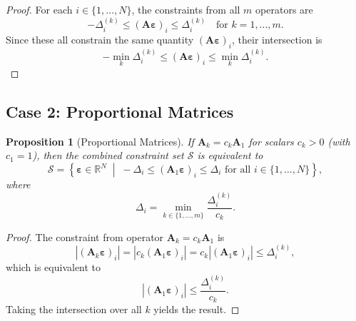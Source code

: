 \documentclass{article}
\newtheorem{proposition}{Proposition}
\begin{document}
\begin{proof}
For each $i \in \{1, \ldots, N\}$, the constraints from all $m$ operators are
\begin{equation}
    -\Delta_i^{(k)} \leq (\mathbf{A} \boldsymbol{\varepsilon})_i \leq \Delta_i^{(k)} \quad \text{for } k = 1, \ldots, m.
\end{equation}
Since these all constrain the same quantity $(\mathbf{A} \boldsymbol{\varepsilon})_i$, their intersection is
\begin{equation}
    -\min_k \Delta_i^{(k)} \leq (\mathbf{A} \boldsymbol{\varepsilon})_i \leq \min_k \Delta_i^{(k)}.
\end{equation}
\end{proof}

\subsection{Case 2: Proportional Matrices}

\begin{proposition}[Proportional Matrices]
\label{prop:proportional}
If $\mathbf{A}_k = c_k \mathbf{A}_1$ for scalars $c_k > 0$ (with $c_1 = 1$), then the combined constraint set $\mathcal{S}$ is equivalent to
\begin{equation}
    \mathcal{S} = \left\{ \boldsymbol{\varepsilon} \in \mathbb{R}^N \;\middle|\; -\Delta_i \leq (\mathbf{A}_1 \boldsymbol{\varepsilon})_i \leq \Delta_i \text{ for all } i \in \{1, \ldots, N\} \right\},
\end{equation}
where
\begin{equation}
    \Delta_i = \min_{k \in \{1, \ldots, m\}} \frac{\Delta_i^{(k)}}{c_k}.
\end{equation}
\end{proposition}

\begin{proof}
The constraint from operator $\mathbf{A}_k = c_k \mathbf{A}_1$ is
\begin{equation}
    |(\mathbf{A}_k \boldsymbol{\varepsilon})_i| = |c_k (\mathbf{A}_1 \boldsymbol{\varepsilon})_i| = c_k |(\mathbf{A}_1 \boldsymbol{\varepsilon})_i| \leq \Delta_i^{(k)},
\end{equation}
which is equivalent to
\begin{equation}
    |(\mathbf{A}_1 \boldsymbol{\varepsilon})_i| \leq \frac{\Delta_i^{(k)}}{c_k}.
\end{equation}
Taking the intersection over all $k$ yields the result.
\end{proof}
\end{document}
